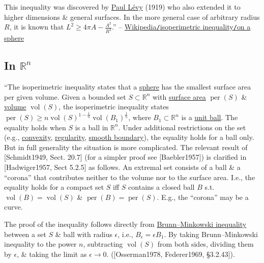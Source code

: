 \documentclass[oneside]{book}
\numberwithin{equation}{section}
\begin{document}
This inequality was discovered by \href{https://en.wikipedia.org/wiki/Paul_L%C3%A9vy_(mathematician)}{Paul L\'evy} (1919) who also extended it to higher dimensions \& general surfaces. In the more general case of arbitrary radius $R$, it is known that $L^2\ge 4\pi A - \frac{A^2}{R^2}$.'' -- \href{https://en.wikipedia.org/wiki/Isoperimetric_inequality#On_a_sphere}{Wikipedia\texttt{/}isoperimetric inequality\texttt{/}on a sphere}

\subsection{In $\mathbb{R}^n$}
``The isoperimetric inequality states that a \href{https://en.wikipedia.org/wiki/Sphere}{sphere} has the smallest surface area per given volume. Given a bounded set $S\subset\mathbb{R}^n$ with \href{https://en.wikipedia.org/wiki/Surface_area}{surface area} $\operatorname{per}(S)$ \& \href{https://en.wikipedia.org/wiki/Volume}{volume} $\operatorname{vol}(S)$, the isoperimetric inequality states $\operatorname{per}(S)\ge n\operatorname{vol}(S)^{1 - \frac{1}{n}}\operatorname{vol}(B_1)^{\frac{1}{n}}$, where $B_1\subset\mathbb{R}^n$ is a \href{https://en.wikipedia.org/wiki/Unit_sphere}{unit ball}. The equality holds when $S$ is a ball in $\mathbb{R}^n$. Under additional restrictions on the set (e.g., \href{https://en.wikipedia.org/wiki/Convex_set}{convexity}, \href{https://en.wikipedia.org/wiki/Closed_regular_set}{regularity}, \href{https://en.wikipedia.org/wiki/Smooth_surface}{smooth boundary}), the equality holds for a ball only. But in full generality the situation is more complicated. The relevant result of [Schmidt1949, Sect. 20.7] (for a simpler proof see [Baebler1957]) is clarified in [Hadwiger1957, Sect 5.2.5] as follows. An extremal set consists of a ball \& a ``corona'' that contributes neither to the volume nor to the surface area. I.e., the equality holds for a compact set $S$ iff $S$ contains a closed ball $B$ s.t. $\operatorname{vol}(B) = \operatorname{vol}(S)$ \& $\operatorname{per}(B) = \operatorname{per}(S)$. E.g., the ``corona'' may be a curve.

The proof of the inequality follows directly from \href{https://en.wikipedia.org/wiki/Brunn%E2%80%93Minkowski_theorem}{Brunn--Minkowski inequality} between a set $S$ \& ball with radius $\epsilon$, i.e., $B_\epsilon = \epsilon B_1$. By taking Brunn--Minkowski inequality to the power $n$, subtracting $\operatorname{vol}(S)$ from both sides, dividing them by $\epsilon$, \& taking the limit as $\epsilon\to 0$. ([Osserman1978, Federer1969, \S3.2.43]).
\end{document}
